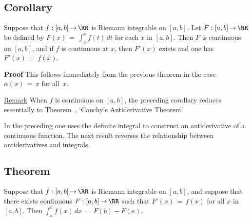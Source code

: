  

\V

         \subsection{\small{{\bf Corollary}}}
        \label{CorH40.30}

\V

        Suppose that $f:[a,b] \,{\rightarrow}\, {\RR}$ is Riemann integrable on $[a,b]$.
    Let $F:[a,b] \,{\rightarrow}\, {\RR}$ be defined by $F(x) \,=\, \int_{a}^{x} f(t)\,dt$ for each $x$ in $[a,b]$.
    Then $F$ is continuous on $[a,b]$, and if $f$ is continuous at $x$, then $F'(x)$ exists and one has $F'(x) \,=\, f(x)$.

\V

        {\bf Proof} This follows immediately from the previous theorem in the case ${\alpha}(x) \,=\, x$ for all~$x$.

\V

        \underline{Remark} When $f$ is continuous on $[a,b]$, the preceding corollary reduces essentially to Theorem~,
    `Cauchy's Antiderivative Theorem'.

\V
\V

        In the preceding one uses the definite integral to construct an antiderivative of a continuous function.
    The next result reverses the relationship between antiderivatives and integrals.

\V

        \subsection{\small{{\bf Theorem}}}
        \label{ThmH40.40}

\V

        Suppose that $f:[a,b] \,{\rightarrow}\, {\RR}$ is Riemann integrable on $[a,b]$, and suppose that there exists continuous $F:[a,b] \,{\rightarrow}\, {\RR}$ such that $F'(x) \,=\, f(x)$ for all $x$ in $[a,b]$.
    Then ${\displaystyle \int_{a}^{b} f(x)\,dx \,=\, F(b) - F(a)}$.

\V

